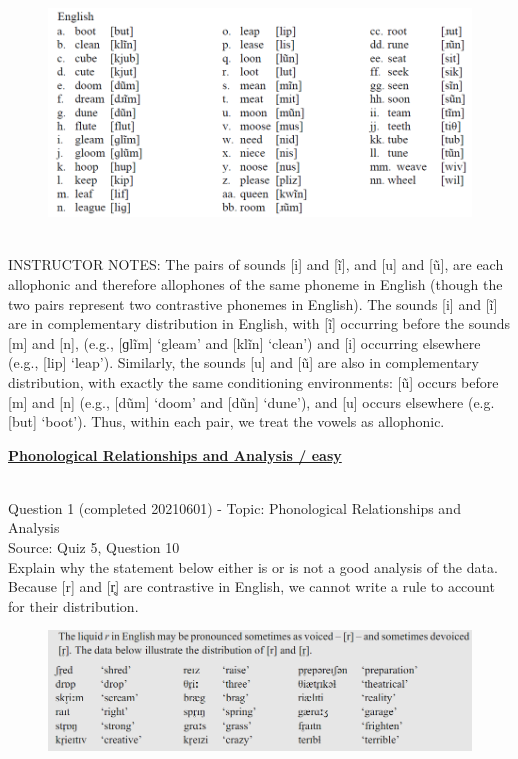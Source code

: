 \documentclass[12pt]{article}
\begin{document}
\begin{figure}[H]
\includegraphics{../images/english12.png}
\end{figure}

~\\
INSTRUCTOR NOTES: The pairs of sounds [i] and [ĩ], and [u] and [ũ], are each allophonic and therefore allophones of the same phoneme in English (though the two pairs represent two contrastive phonemes in English). The sounds [i] and [ĩ] are in complementary distribution in English, with [ĩ] occurring before the sounds [m] and [n], (e.g., [ɡlĩm] ‘gleam’ and [klĩn] ‘clean’) and [i] occurring elsewhere (e.g., [lip] ‘leap’). Similarly, the sounds [u] and [ũ] are also in complementary distribution, with exactly the same conditioning environments: [ũ] occurs before [m] and [n] (e.g., [dũm] ‘doom’ and [dũn] ‘dune’), and [u] occurs elsewhere (e.g. [but] ‘boot’). Thus, within each pair, we treat the vowels as allophonic. 


\newpage\textbf{\underline{\huge Phonological Relationships and Analysis / easy\\}}

~\\

{\large Question 1} (completed 20210601) - Topic: Phonological Relationships and Analysis\\
Source: Quiz 5, Question 10\\

Explain why the statement below either is or is not a good analysis of the data.\\

Because {[r]} and {[r̥]} are contrastive in English, we cannot write a rule to account for their distribution.

\begin{figure}[H]
\includegraphics{../images/peng71_englishr.png}
\end{figure}
\end{document}
